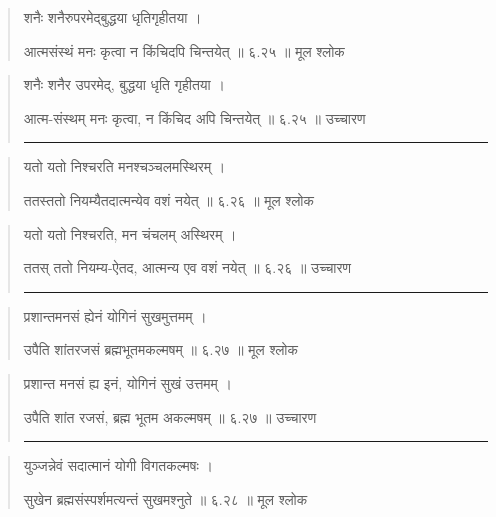 \begin{quotation}  

शनैः शनैरुपरमेद्‍बुद्धया धृतिगृहीतया ।  

आत्मसंस्थं मनः कृत्वा न किंचिदपि चिन्तयेत्‌  ॥ ६.२५ ॥  मूल श्लोक
\end{quotation}

\begin{quotation}

शनैः शनैर उपरमेद्‍, बुद्धया धृति गृहीतया ।  

आत्म-संस्थम् मनः कृत्वा, न किंचिद अपि चिन्तयेत्‌  ॥ ६.२५ ॥  उच्चारण

\noindent\rule{16cm}{0.4pt} 
\end{quotation}


\begin{quotation}  

यतो यतो निश्चरति मनश्चञ्चलमस्थिरम्‌  ।  

ततस्ततो नियम्यैतदात्मन्येव वशं नयेत्‌  ॥ ६.२६ ॥  मूल श्लोक
\end{quotation}

\begin{quotation}

यतो यतो निश्चरति, मन चंचलम् अस्थिरम्‌  ।  

ततस् ततो नियम्य-ऐतद, आत्मन्य एव वशं नयेत्‌  ॥ ६.२६ ॥  उच्चारण

\noindent\rule{16cm}{0.4pt} 
\end{quotation}


\begin{quotation}  

प्रशान्तमनसं ह्येनं योगिनं सुखमुत्तमम्‌  ।  

उपैति शांतरजसं ब्रह्मभूतमकल्मषम्‌  ॥ ६.२७ ॥  मूल श्लोक
\end{quotation}

\begin{quotation}

प्रशान्त मनसं ह्य इनं, योगिनं सुखं उत्तमम्‌  ।  

उपैति शांत रजसं, ब्रह्म भूतम अकल्मषम्‌  ॥ ६.२७ ॥  उच्चारण

\noindent\rule{16cm}{0.4pt} 
\end{quotation}


\begin{quotation}  

युञ्जन्नेवं सदात्मानं योगी विगतकल्मषः  ।  

सुखेन ब्रह्मसंस्पर्शमत्यन्तं सुखमश्नुते  ॥ ६.२८ ॥  मूल श्लोक
\end{quotation}


